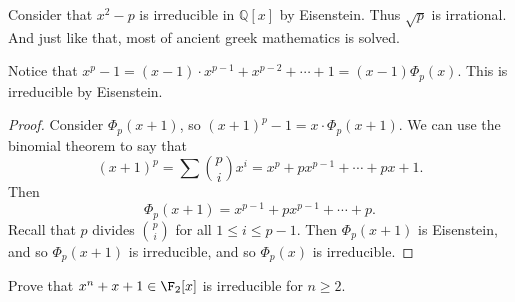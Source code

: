 \begin{example}
Consider that $x^2-p$ is irreducible in $\mathbb{Q}[x]$ by Eisenstein. Thus $\sqrt{p}$ is irrational. And just like that, most of ancient greek mathematics is solved.
\end{example}

\begin{example}
Notice that $x^p - 1 = (x-1) \cdot x^{p-1} + x^{p-2} + \cdots + 1 = (x-1)\Phi_p(x)$. This is irreducible by Eisenstein.

\begin{proof}
Consider $\Phi_p(x+1)$, so $(x+1)^p - 1 = x \cdot \Phi_p(x+1)$. We can use the binomial theorem to say that 
\[ (x+1)^p = \sum {p \choose i}x^i = x^p + px^{p-1} + \cdots + px + 1. \]
Then 
\[ \Phi_p(x+1) = x^{p-1} + px^{p-1} + \cdots + p. \]
Recall that $p$ divides ${p \choose i}$ for all $1 \leq i \leq p-1$. Then $\Phi_p(x+1)$ is Eisenstein, and so $\Phi_p(x+1)$ is irreducible, and so $\Phi_p(x)$ is irreducible.
\end{proof}
\end{example}

\begin{problem}
Prove that $x^n + x + 1 \in \F_2[x]$ is irreducible for $n \geq 2$.
\end{problem}